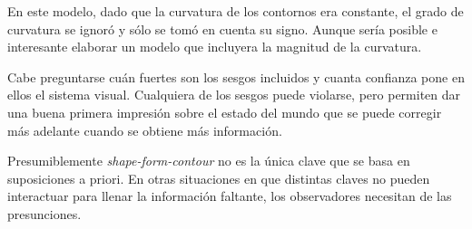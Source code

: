 \documentclass[a4paper,12pt]{article}
\begin{document}
En este modelo, dado que la curvatura de los contornos era constante, el grado de curvatura se ignoró y sólo se tomó en cuenta su signo. Aunque sería posible e interesante elaborar un modelo que incluyera la magnitud de la curvatura.

Cabe preguntarse cuán fuertes son los sesgos incluidos y cuanta confianza pone en ellos el sistema visual. Cualquiera de los sesgos puede violarse, pero permiten dar una buena primera impresión sobre el estado del mundo que se puede corregir más adelante cuando se obtiene más información.

Presumiblemente {\itshape shape-form-contour} no es la única clave que se basa en suposiciones a priori. En otras situaciones en que distintas claves no pueden interactuar para llenar la información faltante, los observadores necesitan de las presunciones.
\end{document}

